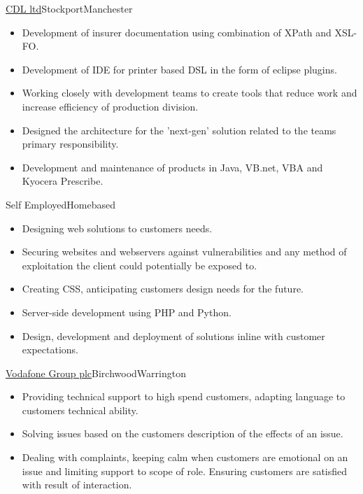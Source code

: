 \documentclass[a4paper,10pt]{moderncv}
\newcommand\weblink[2] {{\color{href} \href{#1}{#2}}}
\begin{document}
{\weblink{http://www.cdl.co.uk}{CDL ltd}}{Stockport}{Manchester}{
\begin{itemize}
  \item Development of insurer documentation using combination of XPath and XSL-FO.
  \item Development of IDE for printer based DSL in the form of eclipse plugins.
  \item Working closely with development teams to create tools that reduce work and increase efficiency of production division.
  \item Designed the architecture for the 'next-gen' solution related to the teams primary responsibility.
  \item Development and maintenance of products in Java, VB.net, VBA and Kyocera Prescribe.
\end{itemize}
}

{Self Employed}{Homebased}{}{
\begin{itemize}
  \item Designing web solutions to customers needs.
  \item Securing websites and webservers against vulnerabilities and any method of exploitation the client could potentially be exposed to.
  \item Creating CSS, anticipating customers design needs for the future.
  \item Server-side development using PHP and Python.
  \item Design, development and deployment of solutions inline with customer expectations.
\end{itemize}
}

{\weblink{http://www.vodafone.com/}{Vodafone Group plc}}{Birchwood}{Warrington}{
\begin{itemize}
  \item Providing technical support to high spend customers, adapting language to customers technical ability.
  \item Solving issues based on the customers description of the effects of an issue.
  \item Dealing with complaints, keeping calm when customers are emotional on an issue and limiting support to scope of role. Ensuring customers are satisfied with result of interaction.
\end{itemize}
}
\end{document}
